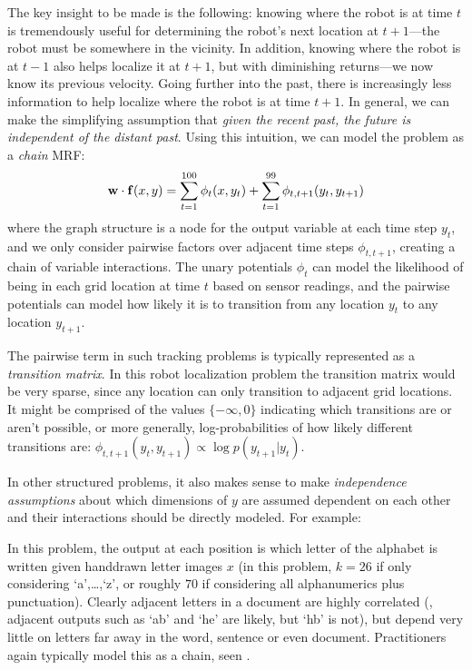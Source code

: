 The key insight to be made is the following: knowing where the robot is at time 
$t$ is tremendously useful for determining the robot's next location at 
$t+1$---the robot must be somewhere in the vicinity.  In addition, knowing 
where the robot is at $t-1$ also helps localize it at $t+1$, but with 
diminishing returns---we now know its previous velocity.  Going further into 
the past, there is increasingly less information to help localize where the 
robot is at time $t+1$.
In general, we can make the simplifying assumption that {\em given the recent 
past, the future is independent of the distant past}.  Using this intuition, we 
can model the problem as a {\em chain} MRF:
\begin{equation}
\mathbf{w} \cdot \mathbf{f}(x,y) = \sum_{t=1}^{100} \phi_t(x,y_t) + \sum_{t=1}^{99} 
\phi_{t,t+1}(y_t,y_{t+1})
\end{equation}
where the graph structure is a node for the output variable at each time step 
$y_t$, and we only consider pairwise factors over adjacent time steps 
$\phi_{t,t+1}$, creating a chain of variable interactions.  The unary 
potentials $\phi_t$ can model the likelihood of being in each grid location at 
time $t$ based on sensor readings, and the pairwise potentials can model how 
likely it is to transition from any location $y_t$ to any location $y_{t+1}$.  

The pairwise term in such tracking problems is typically represented as a {\em 
transition matrix}.  In this robot localization problem the transition matrix 
would be very sparse, since any location can only transition to adjacent grid 
locations.  It might be comprised of the values $\{-\infty,0\}$ indicating 
which transitions are or aren't possible, or more generally, log-probabilities 
of how likely different transitions are: $\phi_{t,t+1}(y_t,y_{t+1}) \propto 
\log p(y_{t+1} | y_t)$.


In other structured problems, it also makes sense to make {\em independence 
assumptions} about which dimensions of $y$ are assumed dependent on each other 
and their interactions should be directly modeled. For example: 

 In this problem, the output at each position is 
which letter of the alphabet is written given handdrawn letter images $x$ (in 
this problem, $k=26$ if only considering `a',\ldots,`z', or roughly $70$ if 
considering all alphanumerics plus punctuation).  Clearly adjacent letters in a 
document are highly correlated (\eg, adjacent outputs such as `ab' and `he' are 
likely, but `hb' is not), but depend very little on letters far away in the 
word, sentence or even document.  Practitioners again typically model this as a 
chain, seen .


